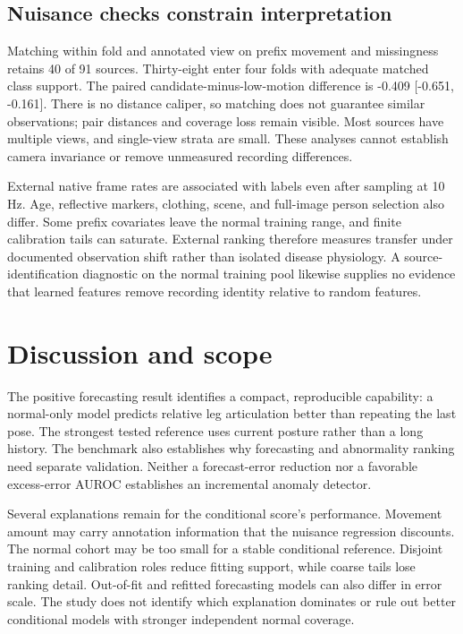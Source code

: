 \documentclass[letterpaper]{article}
\begin{document}
\subsection{Nuisance checks constrain interpretation}

Matching within fold and annotated view on prefix movement and missingness retains 40 of 91 sources. Thirty-eight enter four folds with adequate matched class support. The paired candidate-minus-low-motion difference is -0.409 [-0.651, -0.161]. There is no distance caliper, so matching does not guarantee similar observations; pair distances and coverage loss remain visible. Most sources have multiple views, and single-view strata are small. These analyses cannot establish camera invariance or remove unmeasured recording differences.

External native frame rates are associated with labels even after sampling at 10 Hz. Age, reflective markers, clothing, scene, and full-image person selection also differ. Some prefix covariates leave the normal training range, and finite calibration tails can saturate. External ranking therefore measures transfer under documented observation shift rather than isolated disease physiology. A source-identification diagnostic on the normal training pool likewise supplies no evidence that learned features remove recording identity relative to random features.

\section{Discussion and scope}

The positive forecasting result identifies a compact, reproducible capability: a normal-only model predicts relative leg articulation better than repeating the last pose. The strongest tested reference uses current posture rather than a long history. The benchmark also establishes why forecasting and abnormality ranking need separate validation. Neither a forecast-error reduction nor a favorable excess-error AUROC establishes an incremental anomaly detector.

Several explanations remain for the conditional score's performance. Movement amount may carry annotation information that the nuisance regression discounts. The normal cohort may be too small for a stable conditional reference. Disjoint training and calibration roles reduce fitting support, while coarse tails lose ranking detail. Out-of-fit and refitted forecasting models can also differ in error scale. The study does not identify which explanation dominates or rule out better conditional models with stronger independent normal coverage.
\end{document}
